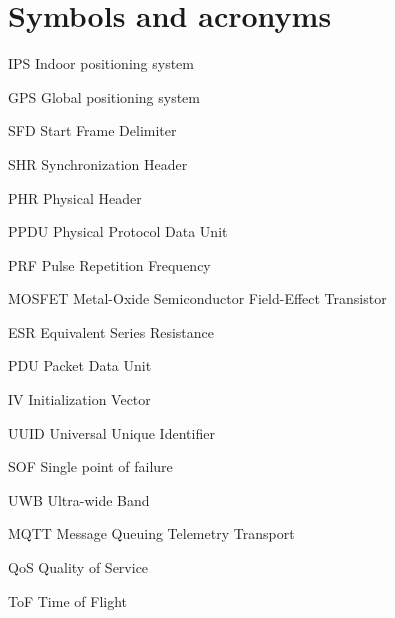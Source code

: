 \documentclass[\main/main.tex]{subfiles}
\begin{document}
\chapter*{Symbols and acronyms}
\begin{abbrv}
    \item[IPS]  Indoor positioning system
    \item[GPS]  Global positioning system 
    \item[SFD]  Start Frame Delimiter
    \item[SHR]  Synchronization Header
    \item[PHR]  Physical Header
    \item[PPDU] Physical Protocol Data Unit
    \item[PRF]  Pulse Repetition Frequency
    \item[MOSFET]  Metal-Oxide Semiconductor Field-Effect Transistor
    \item[ESR]  Equivalent Series Resistance
    \item[PDU] Packet Data Unit
    \item[IV] Initialization Vector
    \item[UUID] Universal Unique Identifier 
    \item[SOF] Single point of failure 
    \item[UWB] Ultra-wide Band 
    \item[MQTT] Message Queuing Telemetry Transport 
    \item[QoS] Quality of Service
    \item[ToF] Time of Flight
\end{abbrv}
\end{document}
